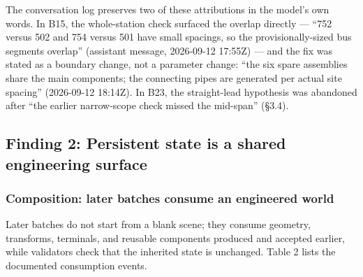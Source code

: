 \documentclass[10pt,a4paper]{article}
\begin{document}
The conversation log preserves two of these attributions in the model's
own words. In B15, the whole-station check surfaced the overlap directly
--- ``752 versus 502 and 754 versus 501 have small spacings, so the
provisionally-sized bus segments overlap'' (assistant message,
2026-09-12 17:55Z) --- and the fix was stated as a boundary change, not
a parameter change: ``the six spare assemblies share the main
components; the connecting pipes are generated per actual site spacing''
(2026-09-12 18:14Z). In B23, the straight-lead hypothesis was abandoned
after ``the earlier narrow-scope check missed the mid-span'' (§3.4).

\hypertarget{finding-2-persistent-state-is-a-shared-engineering-surface}{%
\subsection{Finding 2: Persistent state is a shared engineering
surface}\label{finding-2-persistent-state-is-a-shared-engineering-surface}}

\hypertarget{composition-later-batches-consume-an-engineered-world}{%
\subsubsection{Composition: later batches consume an engineered
world}\label{composition-later-batches-consume-an-engineered-world}}

Later batches do not start from a blank scene; they consume geometry,
transforms, terminals, and reusable components produced and accepted
earlier, while validators check that the inherited state is unchanged.
Table 2 lists the documented consumption events.
\end{document}
